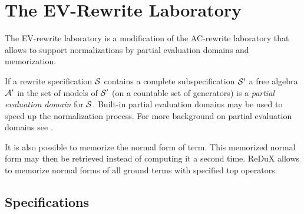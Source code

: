 \section{The EV-Rewrite Laboratory}

The EV-rewrite laboratory is a modification of the AC-rewrite laboratory
that allows to support normalizations by partial evaluation domains and
memorization.

If a rewrite specification $\cal S$  contains a complete subspecification 
$\cal S'$  a free algebra $\cal A'$ in the set of models of $\cal S'$ 
(on a countable set of generators) is a \emph{partial evaluation domain} 
for $\cal S$. 
Built-in partial evaluation domains may be used to speed up the normalization 
process.
For more background on partial evaluation domains see
\cite{BuendgenLauterbach:96a}.

It is also possible to memorize the normal form of  term.
This memorized normal form may then be retrieved instead of computing it
a second time.
ReDuX allows to memorize  normal forms of all ground terms with 
specified top operators.

\subsection{Specifications}

